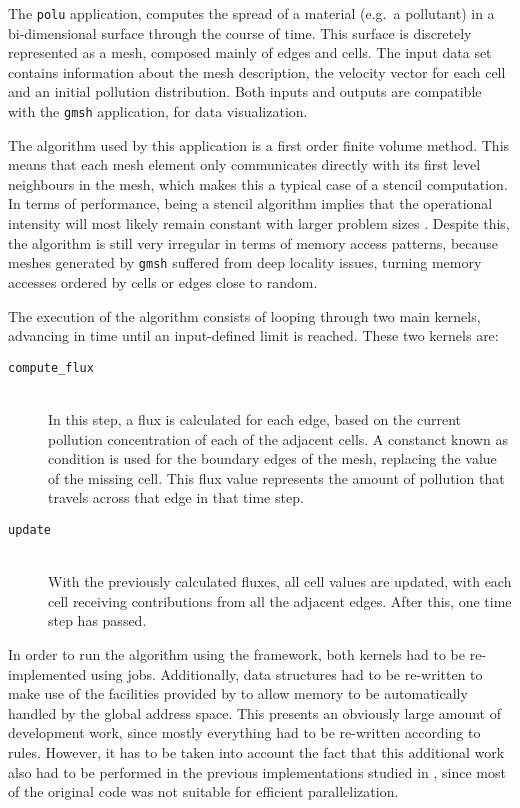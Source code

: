 \documentclass[main.tex]{subfiles}
\begin{document}
The \texttt{polu} application, computes the spread of a material (e.g.\ a pollutant) in a bi-dimensional surface through the course of time. This surface is discretely represented as a mesh, composed mainly of edges and cells. The input data set contains information about the mesh description, the velocity vector for each cell and an initial pollution distribution.
Both inputs and outputs are compatible with the \texttt{gmsh} application, for data visualization.


The algorithm used by this application is a first order finite volume method. This means that each mesh element only communicates directly with its first level neighbours in the mesh, which makes this a typical case of a stencil computation. In terms of performance, being a stencil algorithm implies that the operational intensity will most likely remain constant with larger problem sizes \cite{williams2009roofline,williams2010roofline}. Despite this, the algorithm is still very irregular in terms of memory access patterns, because meshes generated by \texttt{gmsh} suffered from deep locality issues, turning memory accesses ordered by cells or edges close to random.

The execution of the algorithm consists of looping through two main kernels, advancing in time until an input-defined limit is reached. These two kernels are:
\begin{description}
\item[\texttt{compute\_flux}] \hfill \\
  In this step, a flux is calculated for each edge, based on the current pollution concentration of each of the adjacent cells. A constanct known as  condition is used for the boundary edges of the mesh, replacing the value of the missing cell. This flux value represents the amount of pollution that travels across that edge in that time step.

\item[\texttt{update}] \hfill \\
  With the previously calculated fluxes, all cell values are updated, with each cell receiving contributions from all the adjacent edges. After this, one time step has passed.
\end{description}


In order to run the algorithm using the framework, both kernels had to be re-implemented using \gama jobs. Additionally, data structures had to be re-written to make use of the facilities provided by \gama to allow memory to be automatically handled by the global address space.
This presents an obviously large amount of development work, since mostly everything had to be re-written according to \gama rules. However, it has to be taken into account the fact that this additional work also had to be performed in the previous implementations studied in \cite{naps2012}, since most of the original code was not suitable for efficient parallelization.
\end{document}
